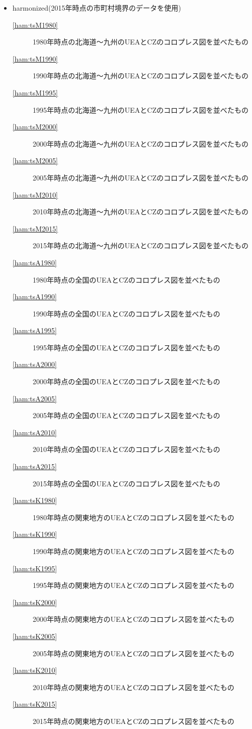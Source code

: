 \documentclass{ltjsarticle}
\begin{document}
\begin{itemize}
\begin{itemize}
    \item harmonized(2015年時点の市町村境界のデータを使用)
    \begin{description}
      \item[\ref{ham:tsM1980}] 1980年時点の北海道～九州のUEAとCZのコロプレス図を並べたもの
      \item[\ref{ham:tsM1990}] 1990年時点の北海道～九州のUEAとCZのコロプレス図を並べたもの
      \item[\ref{ham:tsM1995}] 1995年時点の北海道～九州のUEAとCZのコロプレス図を並べたもの
      \item[\ref{ham:tsM2000}] 2000年時点の北海道～九州のUEAとCZのコロプレス図を並べたもの
      \item[\ref{ham:tsM2005}] 2005年時点の北海道～九州のUEAとCZのコロプレス図を並べたもの
      \item[\ref{ham:tsM2010}] 2010年時点の北海道～九州のUEAとCZのコロプレス図を並べたもの
      \item[\ref{ham:tsM2015}] 2015年時点の北海道～九州のUEAとCZのコロプレス図を並べたもの
      \item[\ref{ham:tsA1980}] 1980年時点の全国のUEAとCZのコロプレス図を並べたもの
      \item[\ref{ham:tsA1990}] 1990年時点の全国のUEAとCZのコロプレス図を並べたもの
      \item[\ref{ham:tsA1995}] 1995年時点の全国のUEAとCZのコロプレス図を並べたもの
      \item[\ref{ham:tsA2000}] 2000年時点の全国のUEAとCZのコロプレス図を並べたもの
      \item[\ref{ham:tsA2005}] 2005年時点の全国のUEAとCZのコロプレス図を並べたもの
      \item[\ref{ham:tsA2010}] 2010年時点の全国のUEAとCZのコロプレス図を並べたもの
      \item[\ref{ham:tsA2015}] 2015年時点の全国のUEAとCZのコロプレス図を並べたもの
      \item[\ref{ham:tsK1980}] 1980年時点の関東地方のUEAとCZのコロプレス図を並べたもの
      \item[\ref{ham:tsK1990}] 1990年時点の関東地方のUEAとCZのコロプレス図を並べたもの
      \item[\ref{ham:tsK1995}] 1995年時点の関東地方のUEAとCZのコロプレス図を並べたもの
      \item[\ref{ham:tsK2000}] 2000年時点の関東地方のUEAとCZのコロプレス図を並べたもの
      \item[\ref{ham:tsK2005}] 2005年時点の関東地方のUEAとCZのコロプレス図を並べたもの
      \item[\ref{ham:tsK2010}] 2010年時点の関東地方のUEAとCZのコロプレス図を並べたもの
      \item[\ref{ham:tsK2015}] 2015年時点の関東地方のUEAとCZのコロプレス図を並べたもの
    \end{description}
  \end{itemize}
\end{itemize}
\end{document}
